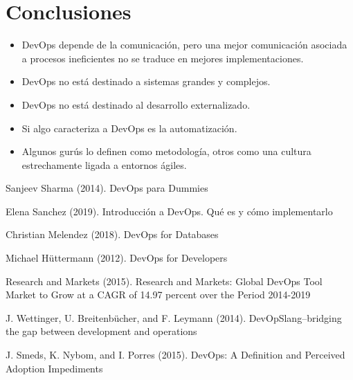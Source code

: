 \documentclass[twoside,twocolumn]{article}
\begin{document}
\section{Conclusiones}
\begin{itemize}
\item DevOps depende de la comunicación, pero una mejor comunicación asociada a procesos ineficientes no se traduce en mejores implementaciones.
\item DevOps no está destinado a sistemas grandes y complejos.
\item DevOps no está destinado al desarrollo externalizado.
\item Si algo caracteriza a DevOps es la automatización.
\item Algunos gurús lo definen como metodología, otros como una cultura estrechamente ligada a entornos ágiles.

\end{itemize}


\begin{thebibliography}{99} %
Sanjeev Sharma (2014).
\newblock DevOps para Dummies

Elena Sanchez (2019).
\newblock Introducción a DevOps. Qué es y cómo implementarlo

Christian Melendez (2018).
\newblock DevOps for Databases

Michael Hüttermann (2012).
\newblock DevOps for Developers

Research and Markets (2015).
\newblock Research and Markets: Global DevOps Tool Market to Grow at a CAGR of 14.97 percent  over the Period 2014-2019

J. Wettinger, U. Breitenbücher, and F. Leymann (2014).
\newblock DevOpSlang–bridging the gap between development and operations

J. Smeds, K. Nybom, and I. Porres (2015).
\newblock DevOps: A Definition and Perceived Adoption Impediments


 
\end{thebibliography}

\end{document}
